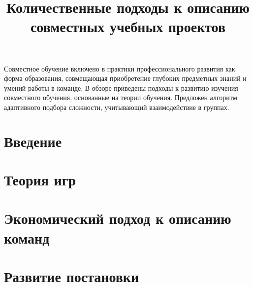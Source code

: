 \documentclass{article}
\begin{document}
\tableofcontents

\title{Количественные подходы к описанию совместных учебных проектов}

\maketitle

\date{\vspace{-12ex}}

Совместное обучение включено в практики профессионального развития как 
форма образования, совмещающая приобретение глубоких предметных знаний и умений 
работы в команде.
В обзоре приведены подходы к развитию изучения совместного обучения,
основанные на теории обучения. Предложен алгоритм адаптивного подбора сложности,
учитывающий взаимодействие в группах.


\section{Введение}



\section{Теория игр}

\section{Экономический подход к описанию команд}



\section{Развитие постановки}



\printbibliography%
\end{document}
